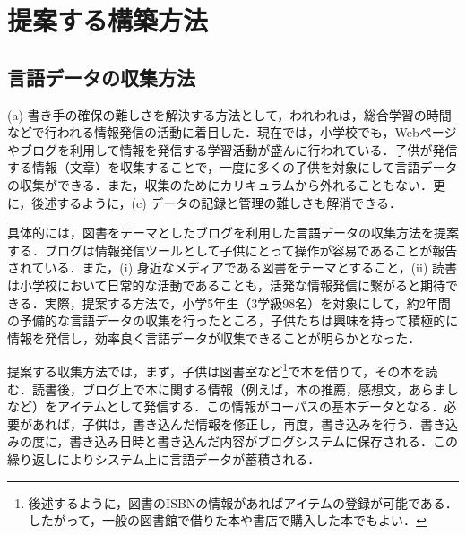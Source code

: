 \documentclass[japanese]{jnlp_1.4}
\begin{document}
\section{提案する構築方法}\label{sec:proposed_method}

\subsection{言語データの収集方法}\label{subsec:system}

(a) 書き手の確保の難しさを解決する方法として，われわれは，総合学習の時間などで行われる情報発信の活動に着目した．現在では，小学校でも，Webページやブログを利用して情報を発信する学習活動が盛んに行われている\cite{ando,suda}．子供が発信する情報（文章）を収集することで，一度に多くの子供を対象にして言語データの収集ができる．また，収集のためにカリキュラムから外れることもない．更に，後述するように，(c) データの記録と管理の難しさも解消できる．


  具体的には，図書をテーマとしたブログを利用した言語データの収集方法を提案する．ブログは情報発信ツールとして子供にとって操作が容易であることが報告されている\cite{suda}．また，(i) 身近なメディアである図書をテーマとすること，(ii) 読書は小学校において日常的な活動であること\cite{suda2}も，活発な情報発信に繋がると期待できる．実際，提案する方法で，小学5年生（3学級98名）を対象にして，約2年間の予備的な言語データの収集を行ったところ，子供たちは興味を持って積極的に情報を発信し，効率良く言語データが収集できることが明らかとなった．


  提案する収集方法では，まず，子供は図書室など\footnote{後述するように，図書のISBNの情報があればアイテムの登録が可能である．したがって，一般の図書館で借りた本や書店で購入した本でもよい．}で本を借りて，その本を読む．読書後，ブログ上で本に関する情報（例えば，本の推薦，感想文，あらましなど）をアイテムとして発信する．この情報がコーパスの基本データとなる．必要があれば，子供は，書き込んだ情報を修正し，再度，書き込みを行う．書き込みの度に，書き込み日時と書き込んだ内容がブログシステムに保存される．この繰り返しによりシステム上に言語データが蓄積される．
\end{document}
